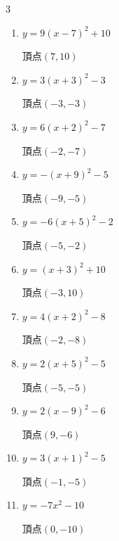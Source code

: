 \begin{multicols}{3}
\begin{enumerate}
        $\displaystyle 頂点\left( 7 , -1 \right)$

  \item $\displaystyle y=9\left( x-7\right)^{2}+10$

        $\displaystyle 頂点\left( 7 , 10 \right)$

  \item $\displaystyle y=3\left( x+3\right)^{2}-3$

        $\displaystyle 頂点\left( -3 , -3 \right)$

  \item $\displaystyle y=6\left( x+2\right)^{2}-7$

        $\displaystyle 頂点\left( -2 , -7 \right)$

  \item $\displaystyle y=-\left( x+9\right)^{2}-5$

        $\displaystyle 頂点\left( -9 , -5 \right)$

  \item $\displaystyle y=-6\left( x+5\right)^{2}-2$

        $\displaystyle 頂点\left( -5 , -2 \right)$

  \item $\displaystyle y=\left( x+3\right)^{2}+10$

        $\displaystyle 頂点\left( -3 , 10 \right)$

  \item $\displaystyle y=4\left( x+2\right)^{2}-8$

        $\displaystyle 頂点\left( -2 , -8 \right)$

  \item $\displaystyle y=2\left( x+5\right)^{2}-5$

        $\displaystyle 頂点\left( -5 , -5 \right)$

  \item $\displaystyle y=2\left( x-9\right)^{2}-6$

        $\displaystyle 頂点\left( 9 , -6 \right)$

  \item $\displaystyle y=3\left( x+1\right)^{2}-5$

        $\displaystyle 頂点\left( -1 , -5 \right)$

  \item $\displaystyle y=-7x^{2}-10$

        $\displaystyle 頂点\left( 0 , -10 \right)$

\columnbreak %


\end{enumerate}
\end{multicols}
